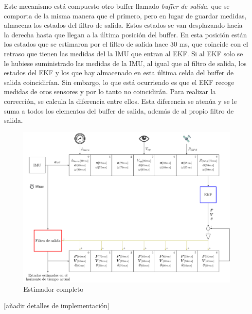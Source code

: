 Este mecanismo está compuesto otro buffer llamado \textit{buffer de salida}, que se comporta de la misma manera que el primero, pero en lugar de guardar medidas, almacena los estados del filtro de salida. Estos estados se van desplazando hacia la derecha hasta que llegan a la última posición del buffer. En esta posición están los estados que se estimaron por el filtro de salida hace 30 ms, que coincide con el retraso que tienen las medidas del la IMU que entran al EKF. Si al EKF solo se le hubiese suministrado las medidas de la IMU, al igual que al filtro de salida, los estados del EKF y los que hay almacenado en esta última celda del buffer de salida coincidirían. Sin embargo, lo que está ocurriendo es que el EKF recoge medidas de oros sensores y por lo tanto no coincidirán. Para realizar la corrección, se calcula la diferencia entre ellos. Esta diferencia se atenúa y se le suma a todos los elementos del buffer de salida, además de al propio filtro de salida. 

\begin{figure}
\includegraphics[width=\textwidth]{estimador_px4/tikz/ekf_output_3}
\caption{Estimador completo}
\label{fig:est3}
\end{figure}


{\color{red} [añadir detalles de implementación]}



